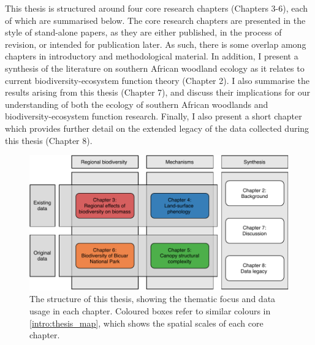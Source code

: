 \begin{refsection}
This thesis is structured around four core research chapters (Chapters 3-6), each of which are summarised below. The core research chapters are presented in the style of stand-alone papers, as they are either published, in the process of revision, or intended for publication later. As such, there is some overlap among chapters in introductory and methodological material. In addition, I present a synthesis of the literature on southern African woodland ecology as it relates to current biodiversity-ecosystem function theory (Chapter 2). I also summarise the results arising from this thesis (Chapter 7), and discuss their implications for our understanding of both the ecology of southern African woodlands and biodiversity-ecosystem function research. Finally, I also present a short chapter which provides further detail on the extended legacy of the data collected during this thesis (Chapter 8). 

\begin{figure}[tb]
\centering
	\includegraphics[width=\textwidth]{img/thesis_struc}
	\caption[Thesis structure and data usage.]{The structure of this thesis, showing the thematic focus and data usage in each chapter. Coloured boxes refer to similar colours in \autoref{intro:thesis_map}, which shows the spatial scales of each core chapter.}
	\label{intro:thesis_struc}
\end{figure}


\end{refsection}
